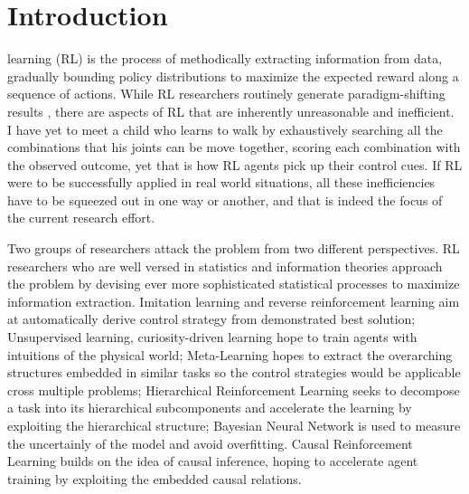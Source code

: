\documentclass[journal]{IEEEtran}
\begin{document}
\section{Introduction}
 learning (RL) is the process of methodically extracting information from data, gradually bounding policy distributions to maximize the expected reward along a sequence of actions. While RL researchers routinely generate paradigm-shifting results \cite{Mnih2013PlayingAW}\cite{Hausknecht2015DeepRQ}\cite{Andrychowicz2020LearningDI}\cite{Kalashnikov2018QTOptSD}\cite{Lee2020LearningQL}, there are aspects of RL that are inherently unreasonable and inefficient. I have yet to meet a child who learns to walk by exhaustively searching all the combinations that his joints can be move together, scoring each combination with the observed outcome, yet that is how RL agents pick up their control cues. If RL were to be successfully applied in real world situations, all these inefficiencies have to be squeezed out in one way or another, and that is indeed the focus of the current research effort. 

Two groups of researchers attack the problem from two different perspectives. RL researchers who are well versed in statistics and information theories approach the problem by devising ever more sophisticated statistical processes to maximize information extraction. Imitation learning and reverse reinforcement learning aim at automatically derive control strategy from demonstrated best solution\cite{Ho2016GenerativeAI}\cite{Peng2018DeepMimicED}\cite{Paine2018OneShotHI}\cite{Peng2020LearningAR}; Unsupervised learning, curiosity-driven learning hope to train agents with intuitions of the physical world\cite{Finn2016UnsupervisedLF}\cite{Pathak2017CuriosityDrivenEB}\cite{Burda2019LargeScaleSO}; Meta-Learning hopes to extract the overarching structures embedded in similar tasks so the control strategies would be applicable cross multiple problems\cite{Finn2017ModelAgnosticMF}\cite{Mishra2018ASN}; Hierarchical Reinforcement Learning seeks to decompose a task into its hierarchical subcomponents and accelerate the learning by exploiting the hierarchical structure\cite{Nachum2018DataEfficientHR}\cite{Vezhnevets2017FeUdalNF}; Bayesian Neural Network is used to measure the uncertainly of the model and avoid overfitting\cite{Blundell2015WeightUI}\cite{Gal2017ConcreteD}. Causal Reinforcement Learning builds on the idea of causal inference, hoping to accelerate agent training by exploiting the embedded causal relations.\cite{Dasgupta2019CausalRF}\cite{Zhang2020DesigningOD}
\end{document}
